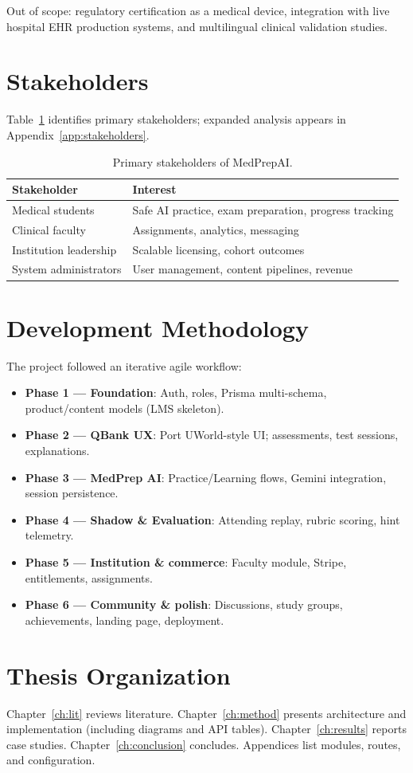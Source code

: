 Out of scope: regulatory certification as a medical device, integration with live hospital EHR production systems, and multilingual clinical validation studies.

\section{Stakeholders}
Table~\ref{tab:stakeholders-intro} identifies primary stakeholders; expanded analysis appears in Appendix~\ref{app:stakeholders}.

\begin{table}[htbp]
  \centering
  \caption{Primary stakeholders of MedPrepAI.}
  \label{tab:stakeholders-intro}
  \begin{tabular}{@{}lp{10cm}@{}}
    \toprule
    \textbf{Stakeholder} & \textbf{Interest} \\
    \midrule
    Medical students & Safe AI practice, exam preparation, progress tracking \\
    Clinical faculty & Assignments, analytics, messaging \\
    Institution leadership & Scalable licensing, cohort outcomes \\
    System administrators & User management, content pipelines, revenue \\
    \bottomrule
  \end{tabular}
\end{table}

\section{Development Methodology}
The project followed an iterative agile workflow:
\begin{itemize}
  \item \textbf{Phase 1 --- Foundation}: Auth, roles, Prisma multi-schema, product/content models (LMS skeleton).
  \item \textbf{Phase 2 --- QBank UX}: Port UWorld-style UI; assessments, test sessions, explanations.
  \item \textbf{Phase 3 --- MedPrep AI}: Practice/Learning flows, Gemini integration, session persistence.
  \item \textbf{Phase 4 --- Shadow \& Evaluation}: Attending replay, rubric scoring, hint telemetry.
  \item \textbf{Phase 5 --- Institution \& commerce}: Faculty module, Stripe, entitlements, assignments.
  \item \textbf{Phase 6 --- Community \& polish}: Discussions, study groups, achievements, landing page, deployment.
\end{itemize}

\section{Thesis Organization}
Chapter~\ref{ch:lit} reviews literature. Chapter~\ref{ch:method} presents architecture and implementation (including diagrams and API tables). Chapter~\ref{ch:results} reports case studies. Chapter~\ref{ch:conclusion} concludes. Appendices list modules, routes, and configuration.

